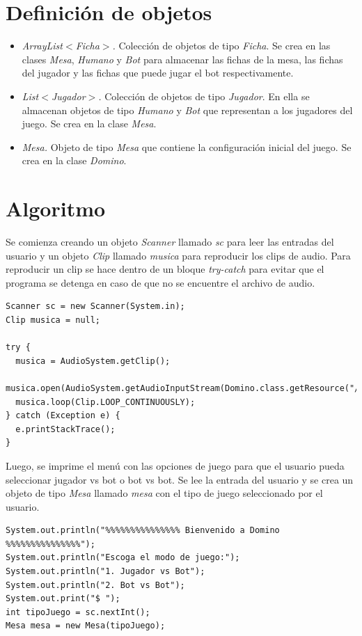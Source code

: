 \documentclass[12pt]{article}
\begin{document}
  \section{Definición de objetos}
  \begin{itemize}
    \item \textit{ArrayList$<$Ficha$>$.} Colección de objetos de tipo \textit{Ficha}. Se crea en las clases \textit{Mesa}, \textit{Humano} y \textit{Bot} para almacenar las fichas de la mesa, las fichas del jugador y las fichas que puede jugar el bot respectivamente.
    \item \textit{List$<$Jugador$>$.} Colección de objetos de tipo \textit{Jugador}. En ella se almacenan objetos de tipo \textit{Humano} y \textit{Bot} que representan a los jugadores del juego. Se crea en la clase \textit{Mesa}.
    \item \textit{Mesa.} Objeto de tipo \textit{Mesa} que contiene la configuración inicial del juego. Se crea en la clase \textit{Domino}.
  \end{itemize}

  \section{Algoritmo}
  Se comienza creando un objeto \textit{Scanner} llamado \textit{sc} para leer las entradas del usuario y un objeto \textit{Clip} llamado \textit{musica} para reproducir los clips de audio. Para reproducir un clip se hace dentro de un bloque \textit{try-catch} para evitar que el programa se detenga en caso de que no se encuentre el archivo de audio.

  \begin{lstlisting}
Scanner sc = new Scanner(System.in);
Clip musica = null;

try {
  musica = AudioSystem.getClip();
  musica.open(AudioSystem.getAudioInputStream(Domino.class.getResource("/recursos/MoonlightSonata.wav")));
  musica.loop(Clip.LOOP_CONTINUOUSLY); 
} catch (Exception e) {
  e.printStackTrace();
}
  \end{lstlisting}

  Luego, se imprime el menú con las opciones de juego para que el usuario pueda seleccionar jugador vs bot o bot vs bot. Se lee la entrada del usuario y se crea un objeto de tipo \textit{Mesa} llamado \textit{mesa} con el tipo de juego seleccionado por el usuario.

  \begin{lstlisting}
System.out.println("%%%%%%%%%%%%%%% Bienvenido a Domino %%%%%%%%%%%%%%%");
System.out.println("Escoga el modo de juego:");
System.out.println("1. Jugador vs Bot");
System.out.println("2. Bot vs Bot");
System.out.print("$ ");
int tipoJuego = sc.nextInt();
Mesa mesa = new Mesa(tipoJuego);
  \end{lstlisting}
\end{document}
